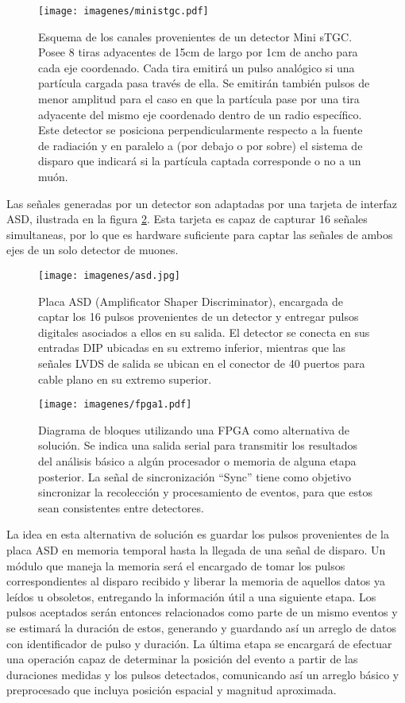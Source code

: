 \begin{figure}[H]
	\centering
	\texttt{[image: imagenes/ministgc.pdf]}
	\caption{Esquema de los canales provenientes de un detector Mini sTGC. Posee 8 tiras adyacentes de 15cm de largo por 1cm de ancho para cada eje coordenado. Cada tira emitirá un pulso analógico si una partícula cargada pasa través de ella. Se emitirán también pulsos de menor amplitud para el caso en que la partícula pase por una tira adyacente del mismo eje coordenado dentro de un radio específico. Este detector se posiciona perpendicularmente respecto a la fuente de radiación y en paralelo a (por debajo o por sobre) el sistema de disparo que indicará si la partícula captada corresponde o no a un muón. }
	\label{fig:ministgc}
\end{figure}

\par Las señales generadas por un detector son adaptadas por una tarjeta de interfaz ASD\cite{1999ATLASICs}, ilustrada en la figura \ref{fig:asd}. Esta tarjeta es capaz de capturar 16 señales simultaneas, por lo que es hardware suficiente para captar las señales de ambos ejes de un solo detector de muones.

\begin{figure}[H]
	\centering
	\texttt{[image: imagenes/asd.jpg]}
	\caption{Placa ASD\cite{1999ATLASICs} (Amplificator Shaper Discriminator), encargada de captar los 16 pulsos provenientes de un detector y entregar pulsos digitales asociados a ellos en su salida. El detector se conecta en sus entradas DIP ubicadas en su extremo inferior, mientras que las señales LVDS de salida se ubican en el conector de 40 puertos para cable plano en su extremo superior.}
	\label{fig:asd}
\end{figure}

\begin{figure}[H]
	\centering
	\texttt{[image: imagenes/fpga1.pdf]}
	\caption{Diagrama de bloques utilizando una FPGA como alternativa de solución. Se indica una salida serial para transmitir los resultados del análisis básico a algún procesador o memoria de alguna etapa posterior. La señal de sincronización ``Sync'' tiene como objetivo sincronizar la recolección y procesamiento de eventos, para que estos sean consistentes entre detectores.}
	\label{fig:fpga1}
\end{figure}


\par La idea en esta alternativa de solución es guardar los pulsos provenientes de la placa ASD en memoria temporal hasta la llegada de una señal de disparo. Un módulo que maneja la memoria será el encargado de tomar los pulsos correspondientes al disparo recibido y liberar la memoria de aquellos datos ya leídos u obsoletos, entregando la información útil a una siguiente etapa. Los pulsos aceptados serán entonces relacionados como parte de un mismo eventos y se estimará la duración de estos, generando y guardando así un arreglo de datos con identificador de pulso y duración. La última etapa se encargará de efectuar una operación capaz de determinar la posición del evento a partir de las duraciones medidas y los pulsos detectados, comunicando así un arreglo básico y preprocesado que incluya posición espacial y magnitud aproximada.


